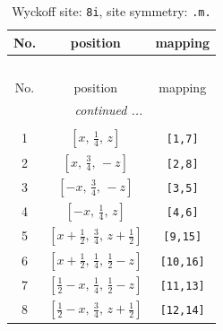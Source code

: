 \documentclass[fleqn,8pt]{jsarticle}
\begin{document}
\begin{longtable}{ccc}
\caption{Wyckoff site: {\tt 8i}, site symmetry: {\tt .m.}}
 \\
 \hline \hline
No. & position & mapping \\ \hline \endfirsthead

\multicolumn{2}{l}{\tablename\ \thetable{}} \\
 \hline \hline
No. & position & mapping \\ \hline \endhead

 \hline \hline
\multicolumn{2}{r}{\footnotesize\it continued ...} \\ \endfoot

 \hline \hline
\multicolumn{2}{r}{} \\ \endlastfoot

1 & $\left[ x,\, \frac{1}{4},\, z \right]$ & {\tt [1,7]} \\ \hline
2 & $\left[ x,\, \frac{3}{4},\, - z \right]$ & {\tt [2,8]} \\ \hline
3 & $\left[ - x,\, \frac{3}{4},\, - z \right]$ & {\tt [3,5]} \\ \hline
4 & $\left[ - x,\, \frac{1}{4},\, z \right]$ & {\tt [4,6]} \\ \hline
5 & $\left[ x + \frac{1}{2},\, \frac{3}{4},\, z + \frac{1}{2} \right]$ & {\tt [9,15]} \\ \hline
6 & $\left[ x + \frac{1}{2},\, \frac{1}{4},\, \frac{1}{2} - z \right]$ & {\tt [10,16]} \\ \hline
7 & $\left[ \frac{1}{2} - x,\, \frac{1}{4},\, \frac{1}{2} - z \right]$ & {\tt [11,13]} \\ \hline
8 & $\left[ \frac{1}{2} - x,\, \frac{3}{4},\, z + \frac{1}{2} \right]$ & {\tt [12,14]} \\
\end{longtable}
\renewcommand{\arraystretch}{1.2}
\end{document}
